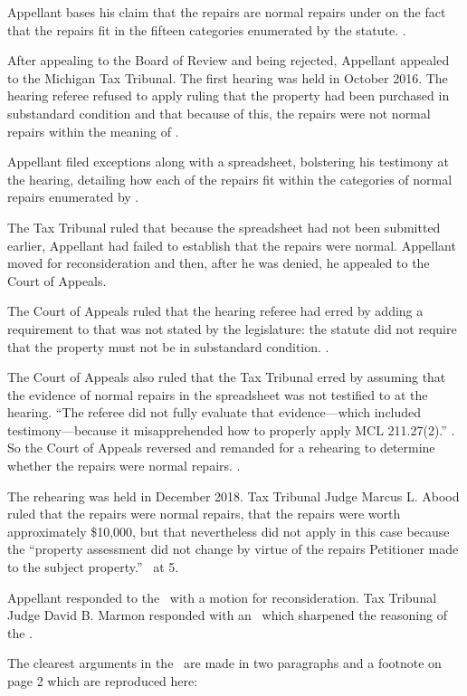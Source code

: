 \documentclass[12pt,\documentclassflag]{michiganCourtOfAppealsBrief}
\begin{document}
Appellant bases his claim that the repairs are normal repairs under \mathieuGast on the fact that the repairs fit in the fifteen categories enumerated by the statute. \repairs.

After appealing to the Board of Review and being rejected, Appellant appealed to the Michigan Tax Tribunal. The first hearing was held in October 2016. The hearing referee refused to apply \mathieuGast ruling that the property had been purchased in substandard condition and that because of this, the repairs were not normal repairs within the meaning of \mathieuGast. 

Appellant filed exceptions along with a spreadsheet, bolstering his testimony at the hearing, detailing how each of the repairs fit within the categories of normal repairs enumerated by \mathieuGast. 
 
The Tax Tribunal ruled that because the spreadsheet had not been submitted earlier, Appellant had failed to establish that the repairs were normal. Appellant moved for reconsideration and then, after he was denied, he appealed to the Court of Appeals.

The Court of Appeals ruled that the hearing referee had erred by adding a requirement to \mathieuGast that was not stated by the legislature: the statute did not require that the property must not be in substandard condition. .
 
The Court of Appeals also ruled that the Tax Tribunal erred by assuming that the evidence of normal repairs in the spreadsheet was not testified to at the hearing. ``The referee did not fully evaluate that evidence---which included testimony---because it misapprehended how to properly apply MCL 211.27(2).'' . So the Court of Appeals reversed and remanded for a rehearing to determine whether the repairs were normal repairs. .

The rehearing was held in December 2018. Tax Tribunal Judge Marcus L. Abood ruled that the repairs were normal repairs, that the repairs were worth approximately \$10,000, but that \mathieuGast nevertheless did not apply in this case because the ``property assessment did not change by virtue of the repairs Petitioner made to the subject property.'' \FOJ\ at 5.

Appellant responded to the \FOJ\ with a motion for reconsideration. Tax Tribunal Judge David B. Marmon responded with an \orderDenying\ which sharpened the reasoning of the \FOJ. 

The clearest arguments in the \orderDenying\ are made in two paragraphs and a footnote on page 2 which are reproduced here:
\end{document}

